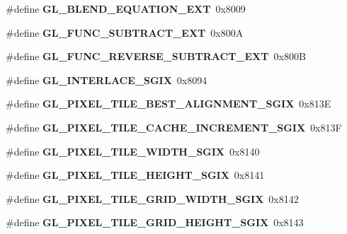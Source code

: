 \begin{DoxyCompactItemize}
\item 
\#define {\bfseries G\+L\+\_\+\+B\+L\+E\+N\+D\+\_\+\+E\+Q\+U\+A\+T\+I\+O\+N\+\_\+\+E\+X\+T}~0x8009\label{_s_d_l__opengl_8h_aaa651ebba53e26be7f5b87e85104ef4e}

\item 
\#define {\bfseries G\+L\+\_\+\+F\+U\+N\+C\+\_\+\+S\+U\+B\+T\+R\+A\+C\+T\+\_\+\+E\+X\+T}~0x800\+A\label{_s_d_l__opengl_8h_aeaa01030ee3b2b3dedee9dcf46efbd44}

\item 
\#define {\bfseries G\+L\+\_\+\+F\+U\+N\+C\+\_\+\+R\+E\+V\+E\+R\+S\+E\+\_\+\+S\+U\+B\+T\+R\+A\+C\+T\+\_\+\+E\+X\+T}~0x800\+B\label{_s_d_l__opengl_8h_a46a02f13902cdf021bb59fdfab23b96e}

\item 
\#define {\bfseries G\+L\+\_\+\+I\+N\+T\+E\+R\+L\+A\+C\+E\+\_\+\+S\+G\+I\+X}~0x8094\label{_s_d_l__opengl_8h_aa384291e4d4e7cfcecaeb30bbc572f6b}

\item 
\#define {\bfseries G\+L\+\_\+\+P\+I\+X\+E\+L\+\_\+\+T\+I\+L\+E\+\_\+\+B\+E\+S\+T\+\_\+\+A\+L\+I\+G\+N\+M\+E\+N\+T\+\_\+\+S\+G\+I\+X}~0x813\+E\label{_s_d_l__opengl_8h_a8cc7fbbb542c06d24c40143847b6c0a9}

\item 
\#define {\bfseries G\+L\+\_\+\+P\+I\+X\+E\+L\+\_\+\+T\+I\+L\+E\+\_\+\+C\+A\+C\+H\+E\+\_\+\+I\+N\+C\+R\+E\+M\+E\+N\+T\+\_\+\+S\+G\+I\+X}~0x813\+F\label{_s_d_l__opengl_8h_ad73c2c30575135dcad99bdc02df30f1e}

\item 
\#define {\bfseries G\+L\+\_\+\+P\+I\+X\+E\+L\+\_\+\+T\+I\+L\+E\+\_\+\+W\+I\+D\+T\+H\+\_\+\+S\+G\+I\+X}~0x8140\label{_s_d_l__opengl_8h_ac1a9f198f6a2c9bbad4597429a7f5143}

\item 
\#define {\bfseries G\+L\+\_\+\+P\+I\+X\+E\+L\+\_\+\+T\+I\+L\+E\+\_\+\+H\+E\+I\+G\+H\+T\+\_\+\+S\+G\+I\+X}~0x8141\label{_s_d_l__opengl_8h_a1d4d01f0f5b2a302591bc7cd65da7f7f}

\item 
\#define {\bfseries G\+L\+\_\+\+P\+I\+X\+E\+L\+\_\+\+T\+I\+L\+E\+\_\+\+G\+R\+I\+D\+\_\+\+W\+I\+D\+T\+H\+\_\+\+S\+G\+I\+X}~0x8142\label{_s_d_l__opengl_8h_a966620eccb0139b2533f6ec094e22c11}

\item 
\#define {\bfseries G\+L\+\_\+\+P\+I\+X\+E\+L\+\_\+\+T\+I\+L\+E\+\_\+\+G\+R\+I\+D\+\_\+\+H\+E\+I\+G\+H\+T\+\_\+\+S\+G\+I\+X}~0x8143\label{_s_d_l__opengl_8h_aea9eb5632d5e562731dece8dda027c8f}


\end{DoxyCompactItemize}
